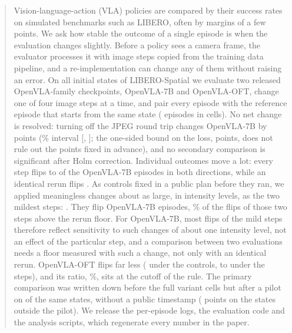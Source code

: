 \begin{abstract}
Vision-language-action (VLA) policies are compared by their success rates on simulated benchmarks such as LIBERO, often by margins of a few points. We ask how stable the outcome of a single episode is when the evaluation changes slightly. Before a policy sees a camera frame, the evaluator processes it with image steps copied from the training data pipeline, and a re-implementation can change any of them without raising an error. On all \NPairs{} initial states of LIBERO-Spatial we evaluate two released OpenVLA-family checkpoints, OpenVLA-7B and OpenVLA-OFT, change one of four image steps at a time, and pair every episode with the reference episode that starts from the same state (\MainEpisodes{} episodes in \NCells{} cells). No net change is resolved: turning off the JPEG round trip changes OpenVLA-7B by \SevJpegDiff{} points (\AlphaPct\% interval [\SevJpegLo, \SevJpegHi]; the one-sided bound on the loss, \SevJpegUB{} points, does not rule out the \ThresholdPts{} points fixed in advance), and no secondary comparison is significant after Holm correction. Individual outcomes move a lot: every step flips \SevFlipsMin{} to \SevFlipsMax{} of the \NPairs{} OpenVLA-7B episodes in both directions, while an identical rerun flips \SevRerunFlips. As controls fixed in a public plan before they ran, we applied meaningless changes about as large, in intensity levels, as the two mildest steps: \ShamWhat. They flip \ShamSevRange{} OpenVLA-7B episodes, \ShamSevRatioPct\% of the flips of those two steps above the rerun floor. For OpenVLA-7B, most flips of the mild steps therefore reflect sensitivity to such changes of about one intensity level, not an effect of the particular step, and a comparison between two evaluations needs a floor measured with such a change, not only with an identical rerun. OpenVLA-OFT flips far less (\ShamOftRange{} under the controls, \OftFlipsMin{} to \OftFlipsMax{} under the steps), and its ratio, \ShamOftRatioPct\%, sits at the cutoff of the rule. The primary comparison was written down before the full variant cells but after a pilot on \PilotPairs{} of the same states, without a public timestamp (\OutDiff{} points on the \OutPairs{} states outside the pilot). We release the per-episode logs, the evaluation code and the analysis scripts, which regenerate every number in the paper.
\end{abstract}
